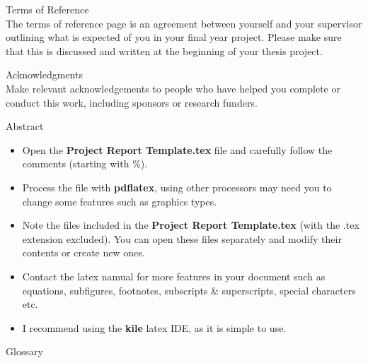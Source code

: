 \documentclass[a4paper,12pt]{report}
\begin{document}
{{\newpage
    {\Huge Terms of Reference}\\
    \vskip 10mm
    The terms of reference page is an agreement between yourself and your supervisor outlining what is expected of you in your final year project. Please make sure that this is discussed and written at the beginning of your thesis project. 


\newpage
{\Huge Acknowledgments}\\
\vskip 10mm
Make relevant acknowledgements to people who have helped you complete or conduct this work, including sponsors or research funders.


\newpage
    {\Huge Abstract}\\
    \vskip 10mm

    \begin{itemize}
        \item Open the {\bf Project Report Template.tex} file and carefully follow the comments (starting with \%).
        \item Process the file with {\bf pdflatex}, using other processors may need you to change some features such as graphics types.
        \item Note the files included in the  {\bf Project Report Template.tex} (with the {.tex} extension excluded). You can open these files separately and modify their contents 
        or create new ones.
        \item Contact the latex namual for more features in your document such as equations, subfigures, footnotes, subscripts \& superscripts, special characters etc.
        \item I recommend using the {\bf kile} latex IDE, as it is simple to use.
    \end{itemize}

\newpage
    {\Huge Glossary}\\
    \vskip 10mm
    
}}
\end{document}
